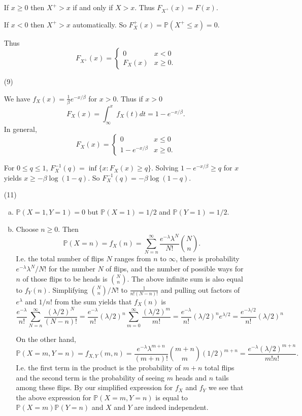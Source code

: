\documentclass[10pt]{article}
\renewcommand{\P}{\mathbb{P}}
\begin{document}
\begin{enumerate}
If $x\geq 0$ then $X^+ > x$ if and only if $X>x$. Thus $F_{X^+}(x)=F(x)$.

If $x<0$ then $X^+>x$ automatically. So $F_X^+(x)=\P(X^+\leq x)=0$.

Thus \[
F_{X^+}(x) =
\begin{cases}
0 & x < 0 \\
F_X(x) & x\geq 0.
\end{cases}
\]

\item[(9)]

We have $f_X(x)=\frac{1}{\beta} e^{-x/\beta}$ for $x > 0$.
Thus if $x>0$
\[
F_X(x) = \int_{\infty}^x f_X(t)dt = 1-e^{-x/\beta}.
\]
In general,
\[
F_X(x) =
\begin{cases}
0 & x \leq 0 \\
1-e^{-x/\beta} & x\geq 0.
\end{cases}
\]

For $0\leq q\leq 1$, $F_X^{-1}(q) = \inf \{x : F_X(x) \geq q\}$. Solving
$1-e^{-x/\beta} \geq q$ for $x$ yields $x\geq -\beta\log(1-q)$. So
$F_X^{-1}(q)=-\beta\log(1-q)$.

\item[(11)]

\begin{enumerate}[(a)]
\item $\P(X=1, Y=1)=0$ but $\P(X=1)=1/2$ and $\P(Y=1)=1/2$.
\item Choose $n\geq 0$. Then
\[
\P(X=n)=f_X(n) = \sum_{N=n}^\infty \frac{e^{-\lambda}\lambda^N}{N!}\binom{N}{n}.
\]
I.e. the total number of flips $N$ ranges from $n$ to $\infty$, there is
probability $e^{-\lambda}\lambda^N/N!$ for the number $N$ of flips, and
the number of possible ways for $n$ of those flips to be heads is
$\binom{N}{n}$. The above infinite sum is also equal to $f_Y(n)$.
Simplifying $\binom{N}{n}/N!$ to $\frac{1}{n!(N-n)!}$ and pulling out factors
of $e^\lambda$ and $1/n!$ from the sum yields that $f_X(n)$ is
\[
\frac{e^{-\lambda}}{n!} \sum_{N=n}^\infty \frac{(\lambda/2)^N}{(N-n)!}
= \frac{e^{-\lambda}}{n!}(\lambda/2)^n \sum_{m=0}^\infty \frac{(\lambda/2)^m}{m!}
= \frac{e^{-\lambda}}{n!}(\lambda/2)^ne^{\lambda/2}
=\frac{e^{-\lambda/2}}{n!}(\lambda/2)^n
\]

On the other hand,
\[
\P(X=m,Y=n) = f_{X,Y}(m,n) =
\frac{e^{-\lambda}\lambda^{m+n}}{(m+n)!}\binom{m+n}{m}(1/2)^{m+n}
=\frac{e^{-\lambda} (\lambda/2)^{m+n}}{m!n!}.
\]
I.e. the first term in the product is the probability of $m+n$ total flips
and the second term is the probability of seeing $m$ heads and $n$ tails among
these flips. By our simplified expression for $f_X$ and $f_Y$ we see that
the above expression for $\P(X=m,Y=n)$ is equal to $\P(X=m)\P(Y=n)$
and $X$ and $Y$ are indeed independent.
\end{enumerate}


\end{enumerate}
\end{document}
